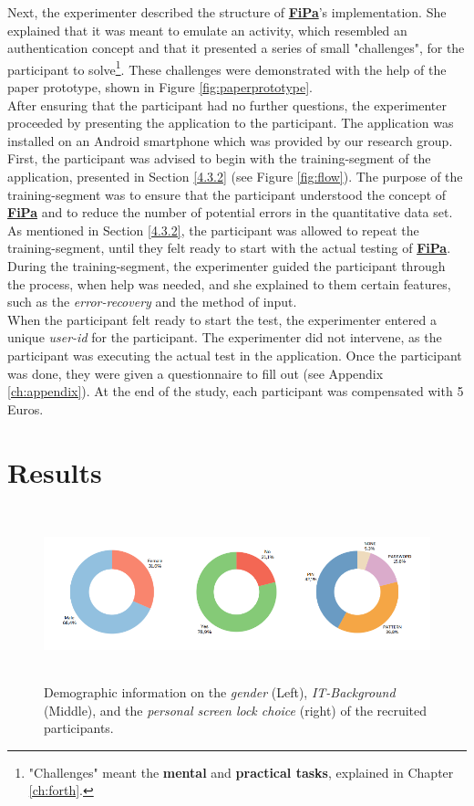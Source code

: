 Next, the experimenter described the structure of \underline{\textbf{FiPa}}'s implementation. She explained that it was meant to emulate an activity, which resembled an authentication concept and that it presented a series of small "challenges", for the participant to solve\footnote{"Challenges" meant the \textbf{mental} and \textbf{practical tasks}, explained in Chapter \ref{ch:forth}.}. These challenges were demonstrated with the help of the paper prototype, shown in Figure \ref{fig:paperprototype}.\\


After ensuring that the participant had no further questions, the experimenter proceeded by presenting the application to the participant. The application was installed on an Android smartphone which was provided by our research group.\\
First, the participant was advised to begin with the training-segment of the application, presented in Section \ref{4.3.2} (see Figure \ref{fig:flow}). The purpose of the training-segment was to ensure that the participant understood the concept of \underline{\textbf{FiPa}} and to reduce the number of potential errors in the quantitative data set. As mentioned in Section \ref{4.3.2}, the participant was allowed to repeat the training-segment, until they felt ready to start with the actual testing of \underline{\textbf{FiPa}}. During the training-segment, the experimenter guided the participant through the process, when help was needed, and she explained to them certain features, such as the \textit{error-recovery} and the method of input. \\

When the participant felt ready to start the test, the experimenter entered a unique \textit{user-id} for the participant. The experimenter did not intervene, as the participant was executing the actual test in the application. Once the participant was done, they were given a questionnaire to fill out (see Appendix \ref{ch:appendix}). At the end of the study, each participant was compensated with 5 Euros.

\section{Results} \label{5.4}

\begin{figure}[t!]
\centering
\includegraphics[width=15cm, height=5cm]{Chapters/graphics/Demos.PNG}
\caption{Demographic information on the \textit{gender} (Left), \textit{IT-Background} (Middle), and the \textit{personal screen lock choice} (right) of the recruited participants.}
\label{fig:demo}
\end{figure}



